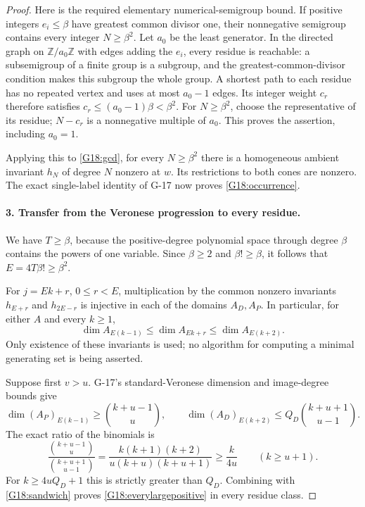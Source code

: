 \documentclass[11pt,a4paper]{article}
\theoremstyle{definition}\newtheorem{definition}{Definition}
\begin{document}
\begin{proof}
Here is the required elementary numerical-semigroup bound. If
positive integers $e_i\leq\beta$ have greatest common divisor one,
their nonnegative semigroup contains every integer $N\geq\beta^2$.
Let $a_0$ be the least generator. In the directed graph on
$\mathbb Z/a_0\mathbb Z$ with edges adding the $e_i$, every residue
is reachable: a subsemigroup of a finite group is a subgroup, and
the greatest-common-divisor condition makes this subgroup the whole
group. A shortest path to each residue has no repeated vertex and
uses at most $a_0-1$ edges. Its integer weight $c_r$ therefore
satisfies $c_r\leq(a_0-1)\beta<\beta^2$. For $N\geq\beta^2$,
choose the representative of its residue; $N-c_r$ is a nonnegative
multiple of $a_0$. This proves the assertion, including $a_0=1$.

Applying this to \eqref{G18:gcd}, for every $N\geq\beta^2$ there
is a homogeneous ambient invariant $h_N$ of degree $N$ nonzero
at $w$. Its restrictions to both cones are nonzero. The exact
single-label identity of G-17 now proves \eqref{G18:occurrence}.

\paragraph{3. Transfer from the Veronese progression to every residue.}
We have $T\geq\beta$, because the positive-degree polynomial
space through degree $\beta$ contains the powers of one variable.
Since $\beta\geq2$ and $\beta!\geq\beta$, it follows that
$E=4T\beta!\geq\beta^2$.

For $j=Ek+r$, $0\leq r<E$, multiplication by the common nonzero
invariants $h_{E+r}$ and $h_{2E-r}$ is injective in each of the
domains $A_D,A_P$. In particular, for either $A$ and every $k\geq1$,
\begin{equation}\label{G18:sandwich}
 \dim A_{E(k-1)}\leq\dim A_{Ek+r}\leq\dim A_{E(k+2)}.
\end{equation}
Only existence of these invariants is used; no algorithm for
computing a minimal generating set is being asserted.

Suppose first $v>u$. G-17's standard-Veronese dimension and
image-degree bounds give
\[
 \dim(A_P)_{E(k-1)}\geq\binom{k+u-1}{u},\qquad
 \dim(A_D)_{E(k+2)}\leq Q_D\binom{k+u+1}{u-1}.
\]
The exact ratio of the binomials is
\[
 \frac{\binom{k+u-1}{u}}{\binom{k+u+1}{u-1}}
 =\frac{k(k+1)(k+2)}{u(k+u)(k+u+1)}
 \geq\frac{k}{4u}\qquad(k\geq u+1).
\]
For $k\geq4uQ_D+1$ this is strictly greater than $Q_D$.
Combining with \eqref{G18:sandwich} proves
\eqref{G18:everylargepositive} in every residue class.


\end{proof}
\end{document}
